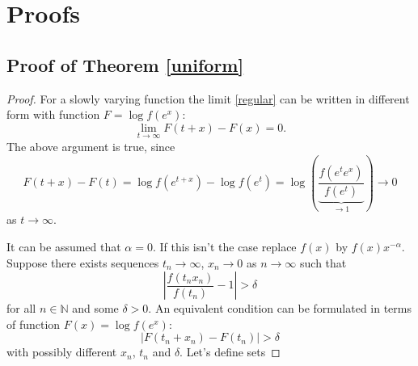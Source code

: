 \documentclass[english,12pt,a4paper,pdftex,sci,utf8]{aaltothesis} %
\begin{document}




\clearpage

\thesisappendix


\section{Proofs}
\label{proofs}
\subsection{Proof of Theorem \ref{uniform}}

\begin{proof}


For a slowly varying function the limit \eqref{regular} can be written in different form with function $F=\log f(e^x)$:
\begin{equation}
\lim_{t \rightarrow \infty} F(t+x)-F(x) = 0.
\label{F}
\end{equation}
The above argument is true, since
\begin{equation*}
F(t+x)-F(t) = \log f(e^{t+x}) - \log f(e^{t}) = \log \left(\underbrace{\frac{f(e^te^x)}{f(e^t)}}_{\rightarrow 1}\right) \rightarrow 0
\end{equation*}
as $t \rightarrow \infty$.





It can be assumed that $\alpha=0$. If this isn't the case replace $f(x)$ by $f(x)x^{-\alpha}$. Suppose there exists sequences $t_n \rightarrow \infty$, $x_n \rightarrow 0$ as $n \rightarrow \infty$ such that
\begin{equation*}
\left| \frac{f(t_nx_n)}{f(t_n)} - 1 \right| > \delta
\end{equation*}
for all $n \in \mathbb{N}$ and some $\delta>0$. An equivalent condition can be formulated in terms of function $F(x) = \log f(e^x)$:
\begin{equation}
\left| F(t_n+x_n) - F(t_n) \right| > \delta
\label{assumption}
\end{equation}
with possibly different $x_n$, $t_n$ and $\delta$. Let's define sets


\end{proof}
\end{document}
